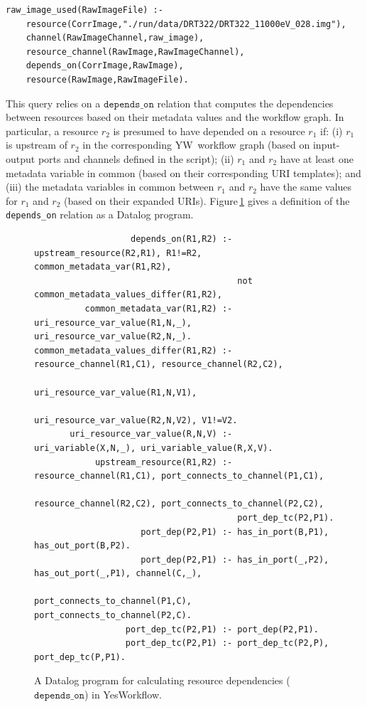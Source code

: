 \documentclass[nocopyrightspace]{sigplanconf}
\newcommand{\Figref}[1]{Figure\,\ref{#1}}
\newcommand{\code}[1]{\ensuremath{\mathtt{#1}}}
\newcommand{\YW}{\textsf{YesWorkflow}}
\newcommand{\yw}{\textsf{YW}}
\begin{document}
\begin{scriptsize}
\begin{verbatim}
raw_image_used(RawImageFile) :-
    resource(CorrImage,"./run/data/DRT322/DRT322_11000eV_028.img"),
    channel(RawImageChannel,raw_image),
    resource_channel(RawImage,RawImageChannel),
    depends_on(CorrImage,RawImage),
    resource(RawImage,RawImageFile).
\end{verbatim}
\end{scriptsize}
This query relies on a \code{depends\_on} relation that computes the
dependencies between resources based on their metadata values and the
workflow graph. In particular, a resource $r_2$ is presumed to have
depended on a resource $r_1$ if: (i) $r_1$ is upstream of $r_2$ in the
corresponding \yw\ workflow graph (based on input-output ports and
channels defined in the script); (ii) $r_1$ and $r_2$ have at least
one metadata variable in common (based on their corresponding URI
templates); and (iii) the metadata variables in common between $r_1$
and $r_2$ have the same values for $r_1$ and $r_2$ (based on their
expanded URIs). \Figref{fig:depends-on} gives a definition of the {\tt
  depends\_on} relation as a Datalog program.

\begin{figure}[!t]
  \begin{small}
  \begin{verbatim}
                   depends_on(R1,R2) :- upstream_resource(R2,R1), R1!=R2, common_metadata_var(R1,R2), 
                                        not common_metadata_values_differ(R1,R2), 
          common_metadata_var(R1,R2) :- uri_resource_var_value(R1,N,_), uri_resource_var_value(R2,N,_).
common_metadata_values_differ(R1,R2) :- resource_channel(R1,C1), resource_channel(R2,C2), 
                                        uri_resource_var_value(R1,N,V1), 
                                        uri_resource_var_value(R2,N,V2), V1!=V2.
       uri_resource_var_value(R,N,V) :- uri_variable(X,N,_), uri_variable_value(R,X,V).
            upstream_resource(R1,R2) :- resource_channel(R1,C1), port_connects_to_channel(P1,C1), 
                                        resource_channel(R2,C2), port_connects_to_channel(P2,C2), 
                                        port_dep_tc(P2,P1).
                     port_dep(P2,P1) :- has_in_port(B,P1), has_out_port(B,P2).
                     port_dep(P2,P1) :- has_in_port(_,P2), has_out_port(_,P1), channel(C,_), 
                                        port_connects_to_channel(P1,C), port_connects_to_channel(P2,C).
                  port_dep_tc(P2,P1) :- port_dep(P2,P1).
                  port_dep_tc(P2,P1) :- port_dep_tc(P2,P), port_dep_tc(P,P1).
  \end{verbatim}
  \end{small}
  \caption{A Datalog program for calculating resource dependencies (\code{depends\_on}) in \YW.}
  \label{fig:depends-on}
\end{figure}
\end{document}
